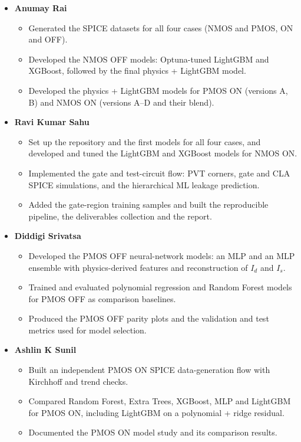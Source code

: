\documentclass[12pt]{article}
\begin{document}
\begin{itemize}
    \item \textbf{Anumay Rai}
    \begin{itemize}
        \item Generated the SPICE datasets for all four cases (NMOS and PMOS, ON and OFF).
        \item Developed the NMOS OFF models: Optuna-tuned LightGBM and XGBoost, followed by the
              final physics + LightGBM model.
        \item Developed the physics + LightGBM models for PMOS ON (versions A, B) and NMOS ON
              (versions A--D and their blend).
    \end{itemize}
    \item \textbf{Ravi Kumar Sahu}
    \begin{itemize}
        \item Set up the repository and the first models for all four cases, and developed and
              tuned the LightGBM and XGBoost models for NMOS ON.
        \item Implemented the gate and test-circuit flow: PVT corners, gate and CLA SPICE
              simulations, and the hierarchical ML leakage prediction.
        \item Added the gate-region training samples and built the reproducible pipeline, the
              deliverables collection and the report.
    \end{itemize}
    \item \textbf{Diddigi Srivatsa}
    \begin{itemize}
        \item Developed the PMOS OFF neural-network models: an MLP and an MLP ensemble with
              physics-derived features and reconstruction of $I_d$ and $I_s$.
        \item Trained and evaluated polynomial regression and Random Forest models for PMOS OFF as
              comparison baselines.
        \item Produced the PMOS OFF parity plots and the validation and test metrics used for
              model selection.
    \end{itemize}
    \item \textbf{Ashlin K Sunil}
    \begin{itemize}
        \item Built an independent PMOS ON SPICE data-generation flow with Kirchhoff and trend
              checks.
        \item Compared Random Forest, Extra Trees, XGBoost, MLP and LightGBM for PMOS ON,
              including LightGBM on a polynomial + ridge residual.
        \item Documented the PMOS ON model study and its comparison results.
    \end{itemize}
\end{itemize}
\end{document}
